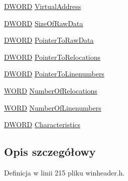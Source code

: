 \begin{DoxyCompactItemize}
\begin{tabbing}
\end{tabbing}\item 
\hyperlink{winheader_8h_af483253b2143078cede883fc3c111ad2}{D\-W\-O\-R\-D} \hyperlink{struct___i_m_a_g_e___s_e_c_t_i_o_n___h_e_a_d_e_r_ab0f0e24d6b0a17680e8609a608a0d530}{Virtual\-Address}
\item 
\hyperlink{winheader_8h_af483253b2143078cede883fc3c111ad2}{D\-W\-O\-R\-D} \hyperlink{struct___i_m_a_g_e___s_e_c_t_i_o_n___h_e_a_d_e_r_a376d19b94bc4c71dc887ec7067e60025}{Size\-Of\-Raw\-Data}
\item 
\hyperlink{winheader_8h_af483253b2143078cede883fc3c111ad2}{D\-W\-O\-R\-D} \hyperlink{struct___i_m_a_g_e___s_e_c_t_i_o_n___h_e_a_d_e_r_a7581621fab8f326e12f31a5577896a71}{Pointer\-To\-Raw\-Data}
\item 
\hyperlink{winheader_8h_af483253b2143078cede883fc3c111ad2}{D\-W\-O\-R\-D} \hyperlink{struct___i_m_a_g_e___s_e_c_t_i_o_n___h_e_a_d_e_r_a6d59f7e4cff74f3951a7da37454b9084}{Pointer\-To\-Relocations}
\item 
\hyperlink{winheader_8h_af483253b2143078cede883fc3c111ad2}{D\-W\-O\-R\-D} \hyperlink{struct___i_m_a_g_e___s_e_c_t_i_o_n___h_e_a_d_e_r_a38bf032a66c8906adca8cb45e4e049b5}{Pointer\-To\-Linenumbers}
\item 
\hyperlink{winheader_8h_ab24077addd3b7b13e086987ff296552c}{W\-O\-R\-D} \hyperlink{struct___i_m_a_g_e___s_e_c_t_i_o_n___h_e_a_d_e_r_ab49e4f9170d85a8cd78ab0acf2fcef2a}{Number\-Of\-Relocations}
\item 
\hyperlink{winheader_8h_ab24077addd3b7b13e086987ff296552c}{W\-O\-R\-D} \hyperlink{struct___i_m_a_g_e___s_e_c_t_i_o_n___h_e_a_d_e_r_aace0e3a76840601729527faff6c55f49}{Number\-Of\-Linenumbers}
\item 
\hyperlink{winheader_8h_af483253b2143078cede883fc3c111ad2}{D\-W\-O\-R\-D} \hyperlink{struct___i_m_a_g_e___s_e_c_t_i_o_n___h_e_a_d_e_r_a5f031b627355f5c2c5412c522280656b}{Characteristics}
\end{DoxyCompactItemize}


\subsection{Opis szczegółowy}


Definicja w linii 215 pliku winheader.\-h.



